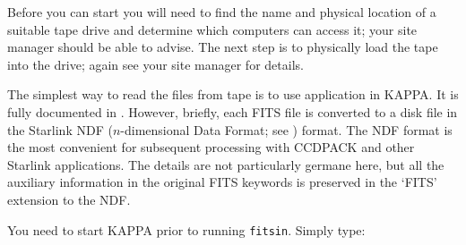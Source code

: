 \documentclass[twoside,11pt]{starlink}
\begin{document}
Before you can start you will need to find the name and physical location
of a suitable tape drive and determine which computers can access it;
your site manager should be able to advise.  The next step is to physically
load the tape into the drive; again see your site manager for details.

The simplest way to read the files from tape is to use application
 in KAPPA.  It is fully documented in
\/\cite{SUN95}.  However, briefly, each FITS
file is converted to a disk file in the Starlink NDF ($n$-dimensional
Data Format; see \cite{SUN33}) format.  The NDF
format is the most convenient for subsequent processing with CCDPACK and
other Starlink applications.  The details are not particularly germane
here, but all the auxiliary information in the original FITS keywords
is preserved in the `FITS' extension to the NDF.

You need to start KAPPA prior to running \texttt{fitsin}.  Simply type:

\begin{terminalv}
\end{terminalv}
\end{document}
